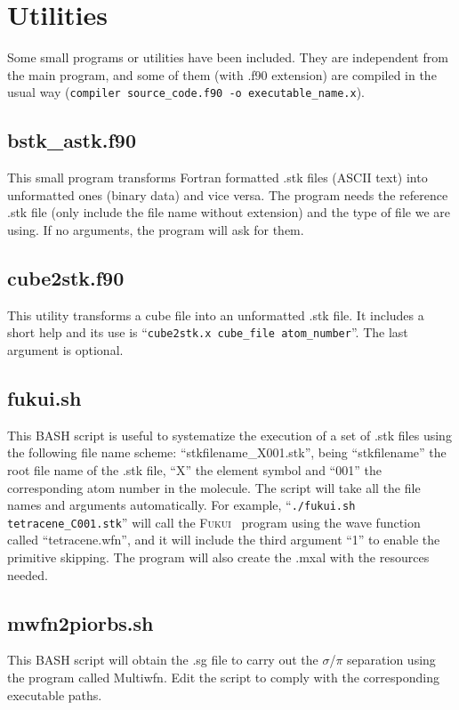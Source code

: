 \documentclass[a4paper,11pt,openany]{memoir}
\newcommand\programa{\textsc{Fukui}}
\begin{document}
\chapter{Utilities}
Some small programs or utilities have been included. They are independent from the main program, and some of them (with .f90 extension) are compiled in the usual way (\texttt{compiler source\_code.f90 -o executable\_name.x}).

\section{bstk\_astk.f90}
This small program transforms Fortran formatted .stk files (ASCII text) into unformatted ones (binary data) and vice versa. The program needs the reference .stk file (only include the file name without extension) and the type of file we are using. If no arguments, the program will ask for them.

\section{cube2stk.f90}
This utility transforms a cube file into an unformatted .stk file. It includes a short help and its use is ``\texttt{cube2stk.x cube\_file atom\_number}''. The last argument is optional.

\section{fukui.sh}
This BASH script is useful to systematize the execution of a set of .stk files using the following file name scheme: ``stkfilename\_X001.stk'', being ``stkfilename'' the root file name of the .stk file, ``X'' the element symbol and ``001'' the corresponding atom number in the molecule. The script will take all the file names and arguments automatically. For example, ``\texttt{./fukui.sh tetracene\_C001.stk}'' will call the \programa~ program using the wave function called ``tetracene.wfn'', and it will include the third argument ``1'' to enable the primitive skipping. The program will also create the .mxal with the resources needed.

\section{mwfn2piorbs.sh}
This BASH script will obtain the .sg file to carry out the $\sigma$/$\pi$ separation using the program called Multiwfn. Edit the script to comply with the corresponding executable paths.
\end{document}
